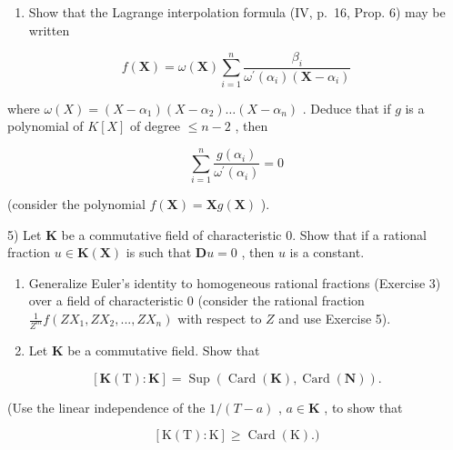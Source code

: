 \begin{enumerate}
\def\labelenumi{\arabic{enumi})}
\setcounter{enumi}{3}
\tightlist
\item
  Show that the Lagrange interpolation formula (IV, p.~16, Prop. 6) may be written
\end{enumerate}

\[
f (\mathbf {X}) = \omega (\mathbf {X}) \sum_ {i = 1} ^ {n} \frac {\beta_ {i}}{\omega^ {\prime} (\alpha_ {i}) (\mathbf {X} - \alpha_ {i})}
\]

where \(\omega(X) = (X - \alpha_1)(X - \alpha_2) \ldots (X - \alpha_n)\) . Deduce that if \(g\) is a polynomial of \(K[X]\) of degree \(\leqslant n - 2\) , then

\[
\sum_ {i = 1} ^ {n} \frac {g (\alpha_ {i})}{\omega^ {\prime} (\alpha_ {i})} = 0
\]

(consider the polynomial \(f(\mathbf{X}) = \mathbf{X}g(\mathbf{X})\) ).

5) Let \(\mathbf{K}\) be a commutative field of characteristic 0. Show that if a rational fraction \(u \in \mathbf{K}(\mathbf{X})\) is such that \(\mathbf{D}u = 0\) , then \(u\) is a constant.

\begin{enumerate}
\def\labelenumi{\arabic{enumi})}
\setcounter{enumi}{5}
\item
  Generalize Euler's identity to homogeneous rational fractions (Exercise 3) over a field of characteristic 0 (consider the rational fraction \(\frac{1}{Z^m} f(ZX_1, ZX_2, ..., ZX_n)\) with respect to \(Z\) and use Exercise 5).
\item
  Let \(\mathbf{K}\) be a commutative field. Show that
\end{enumerate}

\[
[ \mathbf {K} (\mathrm{T}): \mathbf {K} ] = \operatorname{Sup} (\operatorname{Card} (\mathbf {K}), \operatorname{Card} (\mathbf {N})).
\]

(Use the linear independence of the \(1 / (T - a)\) , \(a \in \mathbf{K}\) , to show that

\[
[ \mathrm{K} (\mathrm{T}): \mathrm{K} ] \geqslant \operatorname{Card} (\mathrm{K}).)
\]
